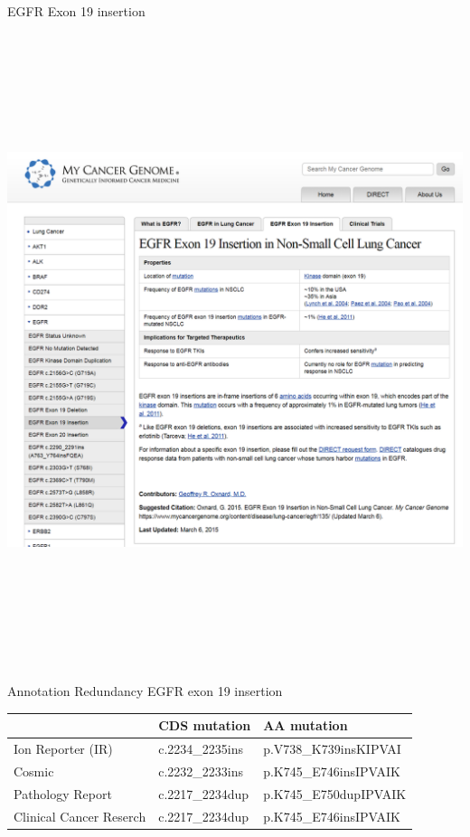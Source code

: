 \documentclass[
  ignorenonframetext,
]{beamer}
\begin{document}
\begin{frame}{EGFR Exon 19 insertion}
\protect\hypertarget{egfr-exon-19-insertion}{}

\includegraphics[width=\textwidth,height=7.29167in]{assets/img/mycancergenome.png}

\end{frame}

\begin{frame}{Annotation Redundancy EGFR exon 19 insertion}
\protect\hypertarget{annotation-redundancy-egfr-exon-19-insertion}{}

\begingroup\fontsize{8}{10}\selectfont

\begin{tabu} to 
\hline
  & CDS mutation & AA mutation\\
\hline
Ion Reporter (IR) & c.2234\_2235ins & p.V738\_K739insKIPVAI\\
\hline
Cosmic & c.2232\_2233ins & p.K745\_E746insIPVAIK\\
\hline
Pathology  Report & c.2217\_2234dup & p.K745\_E750dupIPVAIK\\
\hline
Clinical Cancer Reserch & c.2217\_2234dup & p.K745\_E746insIPVAIK\\
\hline
\end{tabu}
\endgroup{}

\end{frame}
\end{document}

